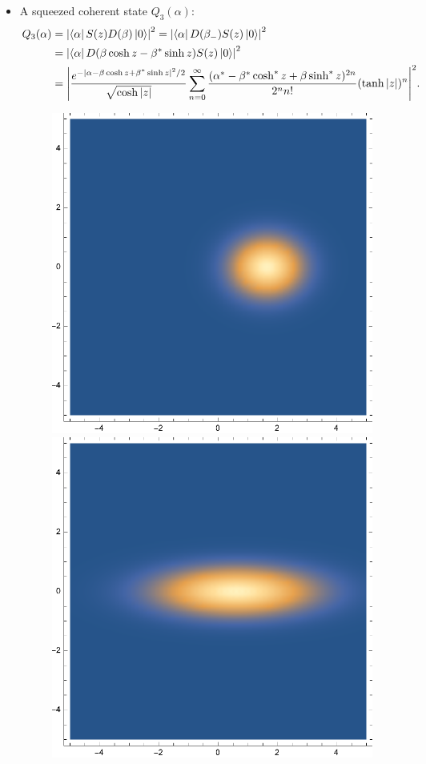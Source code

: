 \documentclass{article}
\theoremstyle{definition}
\newcommand{\al}{\alpha}
\newcommand{\be}{\beta}
\newcommand{\f}[2]{\frac{#1}{#2}}
\begin{document}
\begin{enumerate}[label=(\alph*)]
\begin{itemize}
\item A squeezed coherent state $Q_3(\al)$:
\begin{align*}
Q_3(\al) 
&= \abs{ \bra{\al } S(z) D(\be) \ket{0} }^2 = \abs{ \bra{\al}  D(\be_-) S(z) \ket{0} }^2 \\
&= \abs{ \bra{\al}  D(\be \cosh z - \be^* \sinh z ) S(z) \ket{0} }^2 \\
&= 
\abs{\f{e^{-\abs{\al - \be \cosh z + \be^* \sinh z }^2/2}}{\sqrt{\cosh |z|}} \sum_{n=0}^\infty \f{(\al^* - \be^* \cosh^* z + \be \sinh^* z )^{2n}}{2^n n!} (\tanh |z|)^n}^2.
\end{align*}

\begin{figure}[!htb]
	\centering
	\begin{minipage}{.3\textwidth}
  	\centering
  	\includegraphics[width=.55\linewidth]{figures/Q3-z-02.eps}
	\end{minipage}%
	\begin{minipage}{.3\textwidth}
  	\centering
  	\includegraphics[width=.55\linewidth]{figures/Q3-z-12.eps}
	\end{minipage}

\end{figure}
\end{itemize}
\end{enumerate}
\end{document}
